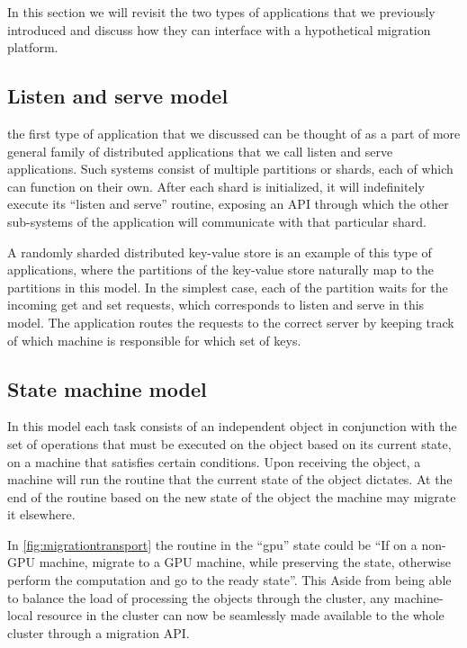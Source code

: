 In this section we will revisit the two types of applications that
we previously introduced and discuss how they can interface with a
hypothetical migration platform.

\subsection{Listen and serve model}
the first type of application that we discussed can be thought of as a
part of more general family of distributed applications that we call
listen and serve applications. Such systems consist of multiple partitions or
shards, each of which can function on their own. After each shard is
initialized, it will indefinitely execute its ``listen and serve'' routine,
exposing an API through which the other sub-systems of the application
will communicate with that particular shard.


A randomly sharded distributed
key-value store is an example of this type of applications, where the
partitions of the key-value store naturally map to the partitions in this
model. In the simplest case, each of the partition waits for the incoming
get and set requests, which corresponds to listen and serve in this model.
The application routes the requests to the correct server by keeping track
of which machine is responsible for which set of keys.

\subsection{State machine model}
In this model each task consists of an
independent object in conjunction with the set of operations that must be
executed on the object based on its current state, on a machine that satisfies
certain conditions. Upon receiving the object, a machine will run the
routine that the current state of the object dictates. At the end of the
routine based on the new state of the object the machine may migrate it
elsewhere.

In \autoref{fig:migrationtransport} the routine in the ``gpu''
state could be
``If on a non-GPU machine, migrate to a GPU machine,
while preserving the state, otherwise perform the computation and
go to the ready state''. This
Aside from being able to balance the load of processing the objects through
the cluster, any machine-local resource in the cluster can now be seamlessly
made available to the whole cluster through a migration API.


